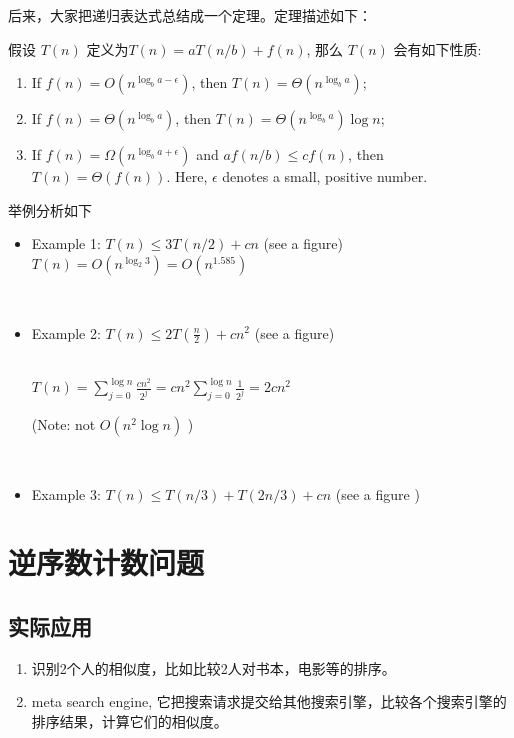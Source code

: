 后来，大家把递归表达式总结成一个定理。定理描述如下：

假设 $T(n)$ 定义为$T(n)=aT(n/b) + f(n)$, 那么 $T(n)$ 会有如下性质: 
\begin{enumerate}
 \item If $f(n)=O(n^{\log_b a - \epsilon})$, then $T(n)=\Theta(n^{\log_b a })$;
 \item If $f(n)=\Theta(n^{\log_b a})$, then $T(n)=\Theta(n^{\log_b a }) \log n $;
 \item If $f(n)=\Omega(n^{\log_b a + \epsilon})$ and $a f(n/b) \leq c f(n)$, then $T(n)=\Theta( f(n) )$. Here, $\epsilon$ denotes a small, positive number. 
\end{enumerate}

举例分析如下
\begin{itemize}
 \item 
Example 1: $T(n) \leq 3 T(n/2) + cn$ (see a figure)
\ \\
$T(n) = O(n^{\log_2 3}) = O(n^{1.585})$


\ \\

\item 
Example 2: $T(n) \leq 2 T(\frac{n}{2}) + cn^2$ (see  a figure)

\ \\
$T(n)= \sum_{j=0}^{\log n} \frac{cn^2}{2^j}  = cn^2 \sum_{j=0}^{\log n} \frac{1}{2^j} = 2cn^2$

(Note: not $O(n^2 \log n)$ )


\ \\
\item 
Example 3: $T(n) \leq T(n/3) + T(2n/3) + cn$ (see a figure )
\end{itemize}



\section{逆序数计数问题}

\subsection{实际应用}
\begin{enumerate}
\item
识别2个人的相似度，比如比较2人对书本，电影等的排序。
\item
meta search engine, 它把搜索请求提交给其他搜索引擎，比较各个搜索引擎的排序结果，计算它们的相似度。
\end{enumerate}


